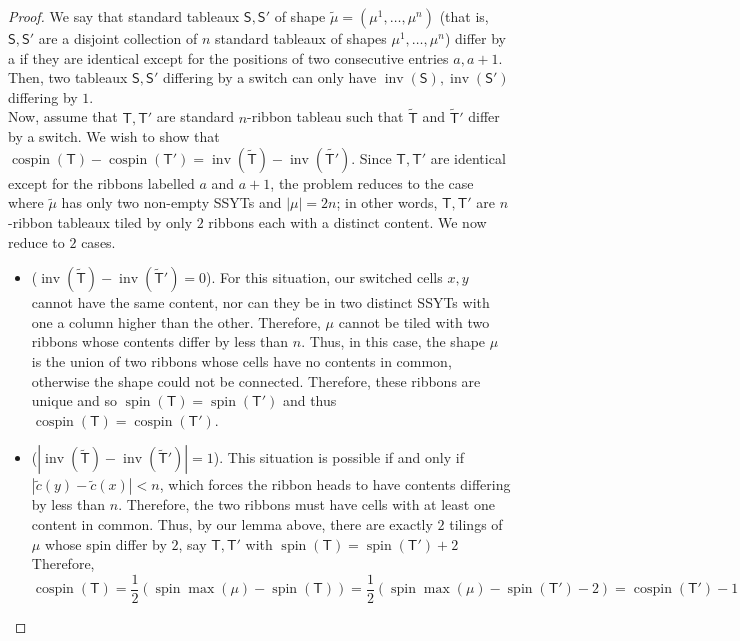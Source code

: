 \documentclass[11pt,leqno,oneside]{amsart}
\numberwithin{thm}{section}
\newcommand{\T}{\mathsf{T}} %
\renewcommand{\S}{\mathsf{S}}
\newcommand{\inv}{\operatorname{inv}}
\newcommand{\spin}{\operatorname{spin}}
\newcommand{\cospin}{\operatorname{cospin}}
\begin{document}
\begin{proof}
  We say that standard tableaux \(\S, \S'\) of shape \(\tilde{\mu} =
  (\mu^1, \dots, \mu^n)\)  (that is, \(\S,\S'\) are a disjoint
  collection of \(n\) standard tableaux of shapes \(\mu^1, \ldots,
  \mu^n\)) differ by a  if they are
  identical except for the positions of two consecutive entries \(a,
  a+1\). Then, two tableaux \(\S,\S'\) differing by a switch can only have
  \(\inv(\S), \inv(\S')\) differing by \(1\). \\

  Now, assume that \(\T,\T'\) are standard \(n\)-ribbon tableau such
  that \(\tilde{\T}\) and \(\tilde{\T}'\) differ by a switch. We
  wish to show that \(\cospin(\T)-\cospin(\T') =
  \inv(\tilde{\T})-\inv(\tilde{\T'})\). Since \(\T,\T'\) are identical
  except for the ribbons labelled \(a\) and \(a+1\), the problem
  reduces to the case where \(\tilde{\mu}\) has only two non-empty SSYTs and
  \(|\mu| = 2n\); in other words, \(\T,\T'\) are \(n\)-ribbon tableaux
  tiled by only \(2\) ribbons each with a distinct content. We now
  reduce to \(2\) cases. 
  \begin{itemize}
  \item (\(\inv(\tilde{\T})-\inv(\tilde{\T}') = 0\)). For this situation, our switched
    cells \(x,y\) cannot have the same content, nor can they be in two
    distinct SSYTs with one a column higher than the
    other. Therefore, \(\mu\) cannot be tiled with two ribbons whose
    contents differ by less than \(n\). Thus, in this case, the shape \(\mu\) is
    the union of two ribbons whose cells have no contents in common,
    otherwise the shape could not be connected. Therefore, these
    ribbons are unique and so \(\spin(\T) = \spin(\T')\) and thus
    \(\cospin(\T) = \cospin(\T')\).
  \item (\(|\inv(\tilde{\T})-\inv(\tilde{\T}')| = 1\)). This situation is possible if and
    only if \(|\tilde{c}(y)-\tilde{c}(x)| < n\), which forces the
    ribbon heads to have contents differing by less than
    \(n\). Therefore, the two ribbons must have cells with at least
    one content in common. Thus, by our lemma above, there are exactly
    \(2\) tilings of \(\mu\) whose spin differ by \(2\), say
    \(\T,\T'\) with \(\spin(\T) = \spin(\T')+2\) Therefore, \[
      \cospin(\T) = \frac{1}{2}(\spin \max(\mu) - \spin(\T)) =
      \frac{1}{2}(\spin \max(\mu) - \spin(\T')-2) = \cospin(\T')-1
    \]
  \end{itemize}
\end{proof}
\end{document}

